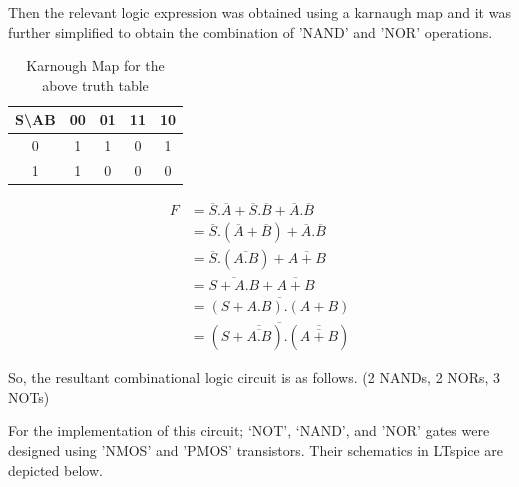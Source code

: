 \documentclass[a4paper,11pt]{article}%
\begin{document}
Then the relevant logic expression was obtained using a karnaugh map and it was further simplified to obtain the combination of 'NAND' and 'NOR' operations.

\begin{table}[H]
	\centering
	\begin{tabular}{c |c| c| c| c}
		S\textbackslash AB & 00 & 01 & 11 & 10\\\hline
		0 & 1 & 1 & 0 & 1\\\hline
		1 & 1 & 0  &0  & 0
	\end{tabular}
	\caption{Karnough Map for the above truth table}
\end{table}

\[
\begin{split}
	F &= \overline{S}.\overline{A} + \overline{S}.\overline{B} + \overline{A}.\overline{B}\\
	&= \overline{S}.(\overline{A}+\overline{B}) + \overline{A}.\overline{B}\\
	&= \overline{S}.(\overline{A.B}) + \overline{A+B}\\
	&= \overline{S+A.B} + \overline{A+B}\\
	& = \overline{(S + A.B).(A+B)}\\
	& =\overline{(S + \overline{\overline{A.B}}).(\overline{\overline{A+B}})}
\end{split}
\]



So, the resultant combinational logic circuit is as follows. (2 NANDs, 2 NORs, 3 NOTs)


For the implementation of this circuit; ‘NOT’, ‘NAND’, and 'NOR' gates were designed using 'NMOS' and 'PMOS' transistors. Their schematics in LTspice are depicted below.
\end{document}
